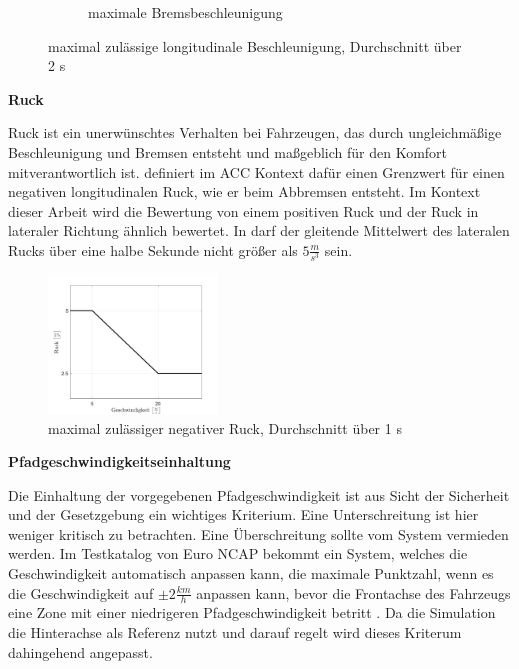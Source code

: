 \begin{figure}[ht]
\begin{subfigure}[b]{.4\textwidth}
        \caption{maximale Bremsbeschleunigung}
        \label{fig:max_deceleration}
    \end{subfigure}
    \hspace*{\fill}
    \caption{maximal zulässige longitudinale Beschleunigung, Durchschnitt über 2 s \cite{ISO15622}}
    \label{fig:iso_acceleration}
\end{figure}

\bigskip\noindent\textbf{Ruck}

\noindent Ruck ist ein unerwünschtes Verhalten bei Fahrzeugen, das durch ungleichmäßige Beschleunigung und Bremsen entsteht und maßgeblich für den Komfort mitverantwortlich ist. \cite{ISO15622} definiert im ACC Kontext dafür einen Grenzwert für einen negativen longitudinalen Ruck, wie er beim Abbremsen entsteht. Im Kontext dieser Arbeit wird die Bewertung von einem positiven Ruck und der Ruck in lateraler Richtung ähnlich bewertet. In \cite{UNECE_R79} darf der gleitende Mittelwert des lateralen Rucks über eine halbe Sekunde nicht größer als $5\frac{m}{s^{3}}$ sein.
\begin{figure}[ht]
    \centering
    \includegraphics[width=0.4\textwidth]{figures/3_Implementierung/max_neg_jerk.pdf}
    \caption{maximal zulässiger negativer Ruck, Durchschnitt über 1 s \cite{ISO15622}}
    \label{fig:neg_jerk}
\end{figure}

\bigskip\noindent\textbf{Pfadgeschwindigkeitseinhaltung}

\noindent Die Einhaltung der vorgegebenen Pfadgeschwindigkeit ist aus Sicht der Sicherheit und der Gesetzgebung ein wichtiges Kriterium. Eine Unterschreitung ist hier weniger kritisch zu betrachten. Eine Überschreitung sollte vom System vermieden werden. Im Testkatalog von Euro NCAP bekommt ein System, welches die Geschwindigkeit automatisch anpassen kann, die maximale Punktzahl, wenn es die Geschwindigkeit auf $\pm2\frac{km}{h}$ anpassen kann, bevor die Frontachse des Fahrzeugs eine Zone mit einer niedrigeren Pfadgeschwindigkeit betritt \cite{NCAP2024}. Da die Simulation die Hinterachse als Referenz nutzt und darauf regelt wird dieses Kriterum dahingehend angepasst.

